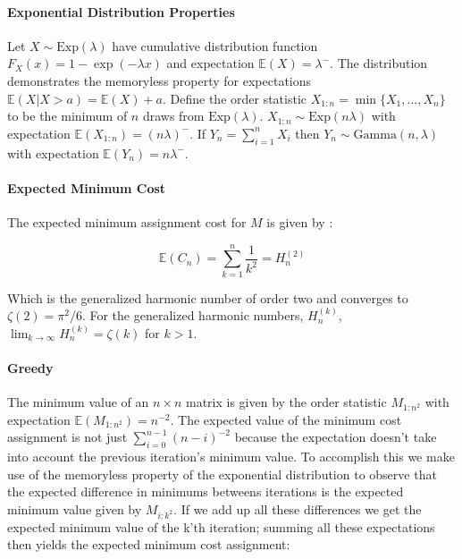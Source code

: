 \documentclass{article}
\newcommand{\expected}[1]{\mathbb{E} \left ( #1 \right )}
\newcommand{\exprv}[1]{\text{Exp} \left( #1 \right )}
\begin{document}
\paragraph{Exponential Distribution Properties}

Let $X \sim \exprv{\lambda}$ have cumulative distribution function $F_X(x) = 1 - \exp{\left(-\lambda x\right)}$ and expectation $\expected{X} = \lambda^{-}$. The distribution demonstrates the memoryless property for expectations $\expected{X \lvert X > a} = \expected{X} + a$. Define the order statistic $X_{1:n} = \min \lbrace X_{1}, \ldots, X_{n} \rbrace $ to be the minimum of $n$ draws from $\exprv{\lambda}$. $X_{1:n} \sim \exprv{n \lambda}$ \cite{balakrishnan2000handbook} with expectation $\expected{X_{1:n}} = \left(n \lambda\right)^-$. If $Y_n = \sum_{i = 1}^{n} X_i$ then $Y_n \sim \text{Gamma}(n, \lambda)$ with expectation $\expected{Y_n} = n \lambda^{-}$.

\paragraph{Expected Minimum Cost}

The expected minimum assignment cost for $M$ is given by \cite{aldous2001zeta}:

\begin{equation}
	\expected{C_n} = \sum_{k = 1}^{n} \frac{1}{k^2} = H_{n}^{(2)}
\end{equation}

Which is the generalized harmonic number of order two and converges to $\zeta(2) = \pi^2/6$. For the generalized harmonic numbers, $H_{n}^{(k)}$, $\lim_{k\to\infty} H_{n}^{(k)} = \zeta(k)$ for $k > 1$.

\paragraph{Greedy}

The minimum value of an $n \times n$ matrix is given by the order statistic $M_{1:n^2}$ with expectation $\expected{ M_{1:n^2} } = n^{-2}$. The expected value of the minimum cost assignment is not just $\sum_{i=0}^{n-1} (n-i)^{-2}$ because the expectation doesn't take into account the previous iteration's minimum value. To accomplish this we make use of the memoryless property of the exponential distribution to observe that the expected difference in minimums betweens iterations is the expected minimum value given by $M_{i:k^2}$. If we add up all these differences we get the expected minimum value of the k'th iteration; summing all these expectations then yields the expected minimum cost assignment:
\end{document}
